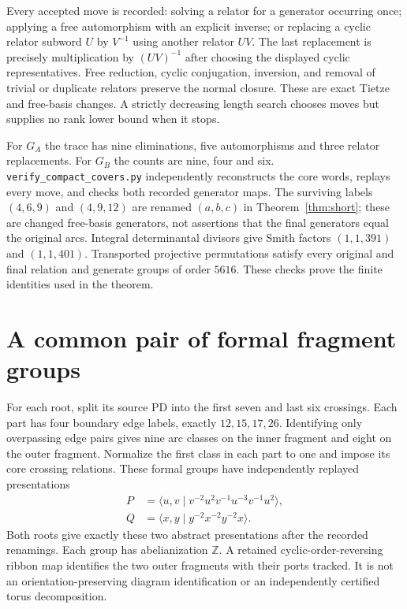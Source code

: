 \documentclass[11pt]{article}
\begin{document}
Every accepted move is recorded: solving a relator for a generator
occurring once; applying a free automorphism with an explicit inverse;
or replacing a cyclic relator subword $U$ by $V^{-1}$ using another
relator $UV$. The last replacement is precisely multiplication by
$(UV)^{-1}$ after choosing the displayed cyclic representatives.
Free reduction, cyclic conjugation, inversion, and removal of trivial
or duplicate relators preserve the normal closure. These are exact
Tietze and free-basis changes. A strictly decreasing length search
chooses moves but supplies no rank lower bound when it stops.

For $G_A$ the trace has nine eliminations, five automorphisms and three
relator replacements. For $G_B$ the counts are nine, four and six.
\texttt{verify\_compact\_covers.py} independently reconstructs the core
words, replays every move, and checks both recorded generator maps.
The surviving labels $(4,6,9)$ and $(4,9,12)$ are renamed $(a,b,c)$
in Theorem~\ref{thm:short}; these are changed free-basis generators,
not assertions that the final generators equal the original arcs.
Integral determinantal divisors give Smith factors $(1,1,391)$ and
$(1,1,401)$. Transported projective permutations satisfy every original
and final relation and generate groups of order $5616$.
These checks prove the finite identities used in the theorem.

\section{A common pair of formal fragment groups}

For each root, split its source PD into the first seven and last six
crossings. Each part has four boundary edge labels, exactly
$12,15,17,26$. Identifying only overpassing edge pairs gives nine arc
classes on the inner fragment and eight on the outer fragment. Normalize
the first class in each part to one and impose its core crossing
relations. These formal groups have independently replayed presentations
\begin{align*}
 P&=\langle u,v\mid v^{-2}u^2v^{-1}u^{-3}v^{-1}u^2\rangle,\\
 Q&=\langle x,y\mid y^{-2}x^{-2}y^{-2}x\rangle.
\end{align*}
Both roots give exactly these two abstract presentations after the
recorded renamings. Each group has abelianization $\mathbb Z$.
A retained cyclic-order-reversing ribbon map identifies the two outer
fragments with their ports tracked. It is not an orientation-preserving
diagram identification or an independently certified torus decomposition.
\end{document}

